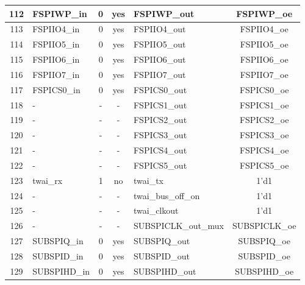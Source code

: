 \begin{longtable}[c]{|c|l|c|c|l|c|}
112  &               FSPIWP\_in  &  0  &  yes  &             FSPIWP\_out  &         FSPIWP\_oe  \\\hline
113  &              FSPIIO4\_in  &  0  &  yes  &            FSPIIO4\_out  &        FSPIIO4\_oe  \\\hline
114  &              FSPIIO5\_in  &  0  &  yes  &            FSPIIO5\_out  &        FSPIIO5\_oe  \\\hline
115  &              FSPIIO6\_in  &  0  &  yes  &            FSPIIO6\_out  &        FSPIIO6\_oe  \\\hline
116  &              FSPIIO7\_in  &  0  &  yes  &            FSPIIO7\_out  &        FSPIIO7\_oe  \\\hline
117  &              FSPICS0\_in  &  0  &  yes  &            FSPICS0\_out  &        FSPICS0\_oe  \\\hline
118  &                        -  &  -  &    -  &            FSPICS1\_out  &        FSPICS1\_oe  \\\hline
119  &                        -  &  -  &    -  &            FSPICS2\_out  &        FSPICS2\_oe  \\\hline
120  &                        -  &  -  &    -  &            FSPICS3\_out  &        FSPICS3\_oe  \\\hline
121  &                        -  &  -  &    -  &            FSPICS4\_out  &        FSPICS4\_oe  \\\hline
122  &                        -  &  -  &    -  &            FSPICS5\_out  &        FSPICS5\_oe  \\\hline
123  &                  twai\_rx  &  1  &   no  &                 twai\_tx  &               1'd1  \\\hline
124  &                        -  &  -  &    -  &       twai\_bus\_off\_on  &               1'd1  \\\hline
125  &                        -  &  -  &    -  &             twai\_clkout  &               1'd1  \\\hline
126  &                        -  &  -  &    -  &     SUBSPICLK\_out\_mux  &      SUBSPICLK\_oe  \\\hline
127  &              SUBSPIQ\_in  &  0  &  yes  &            SUBSPIQ\_out  &        SUBSPIQ\_oe  \\\hline
128  &              SUBSPID\_in  &  0  &  yes  &            SUBSPID\_out  &        SUBSPID\_oe  \\\hline
129  &             SUBSPIHD\_in  &  0  &  yes  &           SUBSPIHD\_out  &       SUBSPIHD\_oe  \\\hline

\end{longtable}

